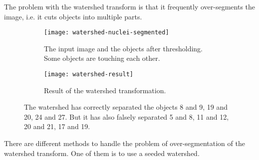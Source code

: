 The problem with the watershed transform is that it frequently over-segments the image, i.e. it cuts objects into multiple parts.

\begin{figure}[h!]
  \centering
\begin{subfigure}[t]{0.30\textwidth}
\texttt{[image: watershed-nuclei-segmented]}
    \caption[Input image for segmentation]{The input image and the objects after thresholding. Some objects are touching each other.}
    \label{watershed-nuclei-segmented}
\end{subfigure}  
\begin{subfigure}[t]{0.30\textwidth}
\texttt{[image: watershed-result]}
    \caption[Watershed result]{Result of the watershed transformation.}
    \label{Watershed result}
\end{subfigure}
   \caption{The watershed has correctly separated the objects 8 and 9, 19 and 20, 24 and 27. But it has also falsely separated 5 and 8, 11 and 12, 20 and 21, 17 and 19.}
   \label{watershed-result-final}
\end{figure}

There are different methods to handle the problem of over-segmentation of the watershed transform. One of them is to use a seeded watershed.